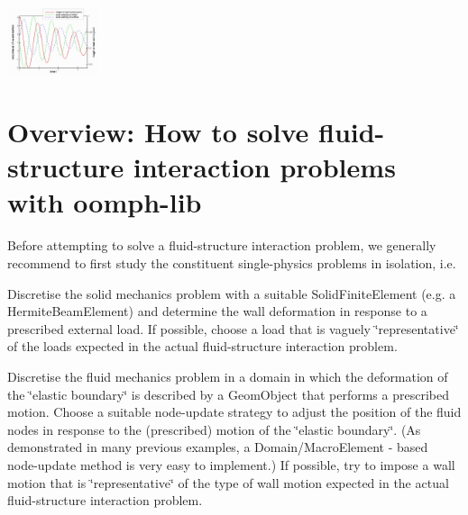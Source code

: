  
\begin{DoxyImage}
\includegraphics[width=0.20\textwidth]{trace_fsi_taylor_hood}
\end{DoxyImage}




 

\hypertarget{index_overview}{}\section{Overview\+: How to solve fluid-\/structure interaction problems with oomph-\/lib}\label{index_overview}
Before attempting to solve a fluid-\/structure interaction problem, we generally recommend to first study the constituent single-\/physics problems in isolation, i.\+e.
\begin{DoxyItemize}
\item Discretise the solid mechanics problem with a suitable {\ttfamily Solid\+Finite\+Element} (e.\+g. a {\ttfamily Hermite\+Beam\+Element}) and determine the wall deformation in response to a prescribed external load. If possible, choose a load that is vaguely \char`\"{}representative\char`\"{} of the loads expected in the actual fluid-\/structure interaction problem.
\item Discretise the fluid mechanics problem in a domain in which the deformation of the \char`\"{}elastic boundary\char`\"{} is described by a {\ttfamily Geom\+Object} that performs a prescribed motion. Choose a suitable node-\/update strategy to adjust the position of the fluid nodes in response to the (prescribed) motion of the \char`\"{}elastic boundary\char`\"{}. (As demonstrated in many previous examples, a {\ttfamily Domain/\+Macro\+Element} -\/ based node-\/update method is very easy to implement.) If possible, try to impose a wall motion that is \char`\"{}representative\char`\"{} of the type of wall motion expected in the actual fluid-\/structure interaction problem.
\end{DoxyItemize}

